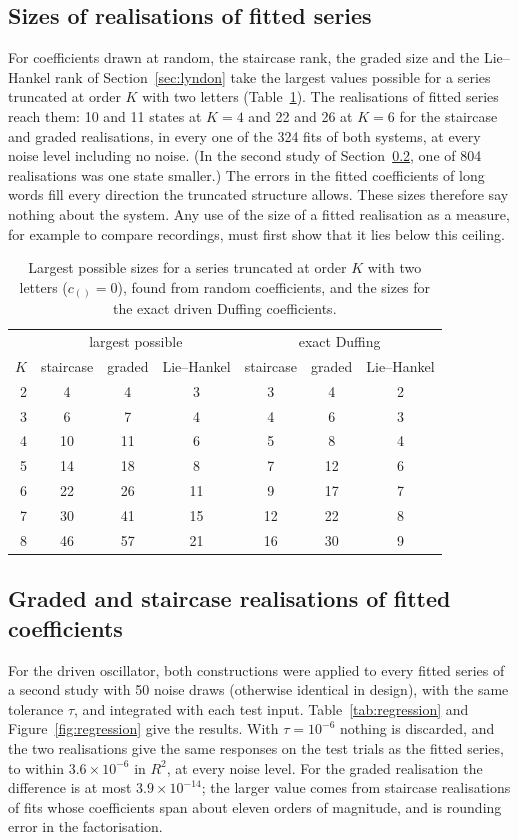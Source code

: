 \documentclass[11pt,a4paper]{article}
\theoremstyle{remark}
\begin{document}
\subsection{Sizes of realisations of fitted series}
For coefficients drawn at random, the staircase rank, the graded size and the Lie--Hankel rank of Section~\ref{sec:lyndon} take the largest values possible for a series truncated at order $K$ with two letters (Table~\ref{tab:generic}).
The realisations of fitted series reach them: 10 and 11 states at $K=4$ and 22 and 26 at $K=6$ for the staircase and graded realisations, in every one of the 324 fits of both systems, at every noise level including no noise.
(In the second study of Section~\ref{sec:regression-fits}, one of 804 realisations was one state smaller.)
The errors in the fitted coefficients of long words fill every direction the truncated structure allows.
These sizes therefore say nothing about the system.
Any use of the size of a fitted realisation as a measure, for example to compare recordings, must first show that it lies below this ceiling.

\begin{table}[t]\centering\small
\caption{Largest possible sizes for a series truncated at order $K$ with two letters ($c_{()}=0$), found from random coefficients, and the sizes for the exact driven Duffing coefficients.}\label{tab:generic}
\begin{tabular}{rcccccc}\toprule
 & \multicolumn{3}{c}{largest possible} & \multicolumn{3}{c}{exact Duffing}\\
$K$ & staircase & graded & Lie--Hankel & staircase & graded & Lie--Hankel\\\midrule
2 & 4 & 4 & 3 & 3 & 4 & 2\\
3 & 6 & 7 & 4 & 4 & 6 & 3\\
4 & 10 & 11 & 6 & 5 & 8 & 4\\
5 & 14 & 18 & 8 & 7 & 12 & 6\\
6 & 22 & 26 & 11 & 9 & 17 & 7\\
7 & 30 & 41 & 15 & 12 & 22 & 8\\
8 & 46 & 57 & 21 & 16 & 30 & 9\\
\bottomrule\end{tabular}
\end{table}

\subsection{Graded and staircase realisations of fitted coefficients}\label{sec:regression-fits}
For the driven oscillator, both constructions were applied to every fitted series of a second study with 50 noise draws (otherwise identical in design), with the same tolerance $\tau$, and integrated with each test input.
Table~\ref{tab:regression} and Figure~\ref{fig:regression} give the results.
With $\tau=10^{-6}$ nothing is discarded, and the two realisations give the same responses on the test trials as the fitted series, to within $3.6\times10^{-6}$ in $R^2$, at every noise level.
For the graded realisation the difference is at most $3.9\times10^{-14}$; the larger value comes from staircase realisations of fits whose coefficients span about eleven orders of magnitude, and is rounding error in the factorisation.
\end{document}
